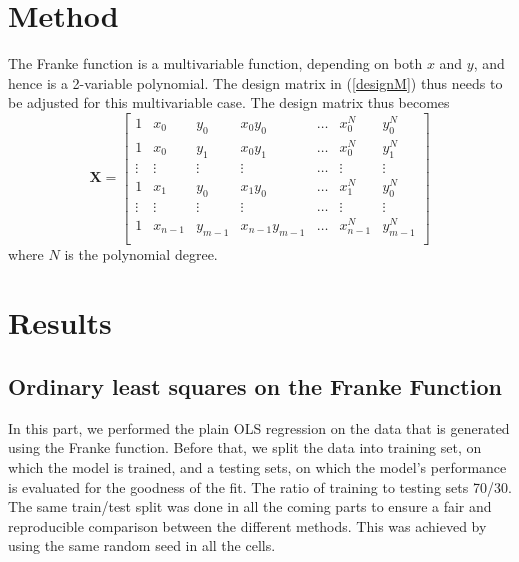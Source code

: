 \documentclass{article}
\begin{document}
\section{Method}
The Franke function is a multivariable function, depending on both $x$ and $y$, and hence is a 2-variable polynomial. The design matrix in (\ref{designM}) thus needs to be adjusted for this multivariable case. The design matrix thus becomes  
$$\textbf{X} = \begin{bmatrix}
1 & x_{0} & y_{0} & x_{0}y_{0} & \dots & x_{0}^{N} & y_{0}^{N}     \\
1 & x_{0} & y_{1} & x_{0}y_{1} & \dots & x_{0}^{N} & y_{1}^{N}  \\
\vdots & \vdots & \vdots & \vdots & \dots & \vdots & \vdots \\
1 & x_{1} & y_{0} & x_{1}y_{0} & \dots & x_{1}^{N} & y_{0}^{N} \\
\vdots & \vdots & \vdots & \vdots & \dots & \vdots & \vdots \\
1 & x_{n-1} & y_{m-1} & x_{n-1}y_{m-1} & \dots & x_{n-1}^{N} & y_{m-1}^{N} \\
\end{bmatrix}$$
where $N$ is the polynomial degree.

\section{Results}
\subsection{Ordinary least squares on the Franke Function}
In this part, we performed the plain OLS regression on the data that is generated using the Franke function. Before that, we split the data into training set, on which the model is trained, and a testing sets, on which the model’s performance is evaluated for the goodness of the fit. The ratio of training to testing sets 70/30. The same train/test split was done in all the coming parts to ensure a fair and reproducible comparison between the different methods. This was achieved by using the same random seed in all the cells.
\end{document}
